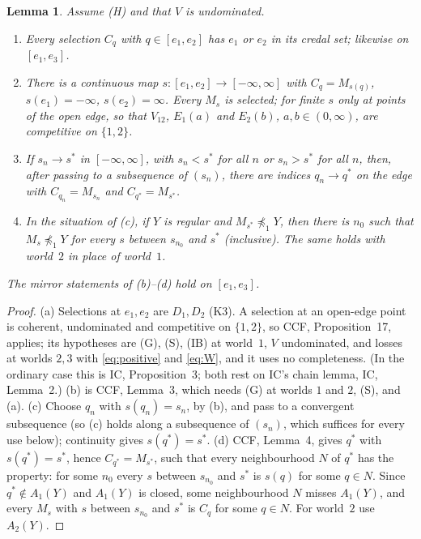 \documentclass[11pt]{article}
\newtheorem{lemma}[theorem]{Lemma}
\theoremstyle{definition}\newtheorem{definition}[theorem]{Definition}
\theoremstyle{remark}\newtheorem{remark}[theorem]{Remark}
\begin{document}
\begin{lemma}\label{lem:edges}
Assume (H) and that $V$ is undominated.
\begin{enumerate}[label=(\alph*)]
\item Every selection $C_q$ with $q\in[e_1,e_2]$ has $e_1$ or $e_2$ in its
credal set; likewise on $[e_1,e_3]$.
\item There is a continuous map $s\colon[e_1,e_2]\to[-\infty,\infty]$ with
$C_q=M_{s(q)}$, $s(e_1)=-\infty$, $s(e_2)=\infty$. Every $M_s$ is selected;
for finite $s$ only at points of the open edge, so that $V_{12}$, $E_1(a)$
and $E_2(b)$, $a,b\in(0,\infty)$, are competitive on $\{1,2\}$.
\item If $s_n\to s^*$ in $[-\infty,\infty]$, with $s_n<s^*$ for all $n$ or
$s_n>s^*$ for all $n$, then, after passing to a subsequence of
$(s_n)$, there are indices $q_n\to q^*$ on the edge with
$C_{q_n}=M_{s_n}$ and $C_{q^*}=M_{s^*}$.
\item In the situation of (c), if $Y$ is regular and $M_{s^*}\not\preceq_1Y$,
then there is $n_0$ such that $M_s\not\preceq_1Y$ for every $s$ between
$s_{n_0}$ and $s^*$ (inclusive). The same holds with world~$2$ in place of
world~$1$.
\end{enumerate}
The mirror statements of (b)--(d) hold on $[e_1,e_3]$.
\end{lemma}
\begin{proof}
(a) Selections at $e_1,e_2$ are $D_1,D_2$ (K3). A selection at an open-edge
point is coherent, undominated and competitive on $\{1,2\}$, so CCF,
Proposition~17, applies; its hypotheses are (G), (S), (IB) at world~$1$, $V$
undominated, and losses at worlds $2,3$ with \eqref{eq:positive} and
\eqref{eq:W}, and it uses no completeness. (In the ordinary case this is IC,
Proposition~3; both rest on IC's chain lemma, IC, Lemma~2.) (b) is CCF, Lemma~3, which needs
(G) at worlds $1$ and $2$, (S), and (a). (c) Choose $q_n$ with
$s(q_n)=s_n$, by (b), and pass to a convergent subsequence (so (c) holds
along a subsequence of $(s_n)$, which suffices for every use below);
continuity gives $s(q^*)=s^*$. (d) CCF, Lemma~4, gives $q^*$ with $s(q^*)=s^*$, hence
$C_{q^*}=M_{s^*}$, such that every neighbourhood $N$ of $q^*$ has the property:
for some $n_0$ every $s$ between $s_{n_0}$ and $s^*$ is $s(q)$ for some $q\in
N$. Since $q^*\notin A_1(Y)$ and $A_1(Y)$ is closed, some neighbourhood $N$
misses $A_1(Y)$, and every $M_s$ with $s$ between $s_{n_0}$ and $s^*$ is
$C_q$ for some $q\in N$. For world~$2$ use $A_2(Y)$.
\end{proof}
\end{document}
